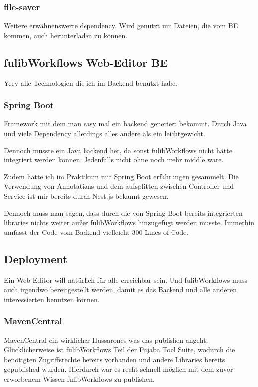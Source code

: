 \subsubsection{file-saver}
Weitere erwähnenswerte dependency.
Wird genutzt um Dateien, die vom BE kommen, auch herunterladen zu können.

\subsection{fulibWorkflows Web-Editor BE}\label{subsubsec:backend}
Yeey alle Technologien die ich im Backend benutzt habe.

\subsubsection{Spring Boot}
Framework mit dem man easy mal ein backend generiert bekommt.
Durch Java und viele Dependency allerdings alles andere als ein leichtgewicht.

Dennoch musste ein Java backend her, da sonst fulibWorkflows nicht hätte integriert werden können.
Jedenfalls nicht ohne noch mehr middle ware.

Zudem hatte ich im Praktikum mit Spring Boot erfahrungen gesammelt.
Die Verwendung von Annotations und dem aufsplitten zwischen Controller und Service ist mir bereits
durch Nest.js bekannt gewesen.

Dennoch muss man sagen, dass durch die von Spring Boot bereits integrierten libraries nichts weiter
außer fulibWorkflows hinzugefügt werden musste.
Immerhin umfasst der Code vom Backend vielleicht 300 Lines of Code.

\subsection{Deployment}\label{subsec:deployment}
Ein Web Editor will natürlich für alle erreichbar sein.
Und fulibWorkflows muss auch irgendwo bereitgestellt werden, damit es das Backend und alle anderen
interessierten benutzen können.

\subsubsection{MavenCentral}\label{subsubsec:mavencentral}
MavenCentral ein wirklicher Hussarones was das publishen angeht.
Glücklicherweise ist fulibWorkflows Teil der Fujaba Tool Suite, wodurch die benötigten
Zugriffsrechte bereits vorhanden und andere Libraries bereits gepublished wurden.
Hierdurch war es recht schnell möglich mit dem zuvor erworbenem Wissen fulibWorkflows
zu publishen.

